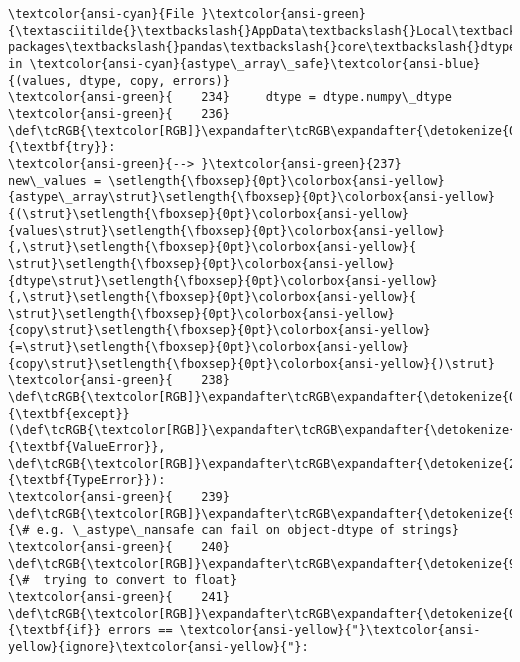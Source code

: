 \documentclass[11pt]{article}
\begin{document}
\begin{Verbatim}[commandchars=\\\{\}, frame=single, framerule=2mm, rulecolor=\color{outerrorbackground}]
\textcolor{ansi-cyan}{File }\textcolor{ansi-green}{\textasciitilde{}\textbackslash{}AppData\textbackslash{}Local\textbackslash{}Programs\textbackslash{}Python\textbackslash{}Python313\textbackslash{}Lib\textbackslash{}site-packages\textbackslash{}pandas\textbackslash{}core\textbackslash{}dtypes\textbackslash{}astype.py:237}, in \textcolor{ansi-cyan}{astype\_array\_safe}\textcolor{ansi-blue}{(values, dtype, copy, errors)}
\textcolor{ansi-green}{    234}     dtype = dtype.numpy\_dtype
\textcolor{ansi-green}{    236} \def\tcRGB{\textcolor[RGB]}\expandafter\tcRGB\expandafter{\detokenize{0,135,0}}{\textbf{try}}:
\textcolor{ansi-green}{--> }\textcolor{ansi-green}{237}     new\_values = \setlength{\fboxsep}{0pt}\colorbox{ansi-yellow}{astype\_array\strut}\setlength{\fboxsep}{0pt}\colorbox{ansi-yellow}{(\strut}\setlength{\fboxsep}{0pt}\colorbox{ansi-yellow}{values\strut}\setlength{\fboxsep}{0pt}\colorbox{ansi-yellow}{,\strut}\setlength{\fboxsep}{0pt}\colorbox{ansi-yellow}{ \strut}\setlength{\fboxsep}{0pt}\colorbox{ansi-yellow}{dtype\strut}\setlength{\fboxsep}{0pt}\colorbox{ansi-yellow}{,\strut}\setlength{\fboxsep}{0pt}\colorbox{ansi-yellow}{ \strut}\setlength{\fboxsep}{0pt}\colorbox{ansi-yellow}{copy\strut}\setlength{\fboxsep}{0pt}\colorbox{ansi-yellow}{=\strut}\setlength{\fboxsep}{0pt}\colorbox{ansi-yellow}{copy\strut}\setlength{\fboxsep}{0pt}\colorbox{ansi-yellow}{)\strut}
\textcolor{ansi-green}{    238} \def\tcRGB{\textcolor[RGB]}\expandafter\tcRGB\expandafter{\detokenize{0,135,0}}{\textbf{except}} (\def\tcRGB{\textcolor[RGB]}\expandafter\tcRGB\expandafter{\detokenize{215,95,95}}{\textbf{ValueError}}, \def\tcRGB{\textcolor[RGB]}\expandafter\tcRGB\expandafter{\detokenize{215,95,95}}{\textbf{TypeError}}):
\textcolor{ansi-green}{    239}     \def\tcRGB{\textcolor[RGB]}\expandafter\tcRGB\expandafter{\detokenize{95,135,135}}{\# e.g. \_astype\_nansafe can fail on object-dtype of strings}
\textcolor{ansi-green}{    240}     \def\tcRGB{\textcolor[RGB]}\expandafter\tcRGB\expandafter{\detokenize{95,135,135}}{\#  trying to convert to float}
\textcolor{ansi-green}{    241}     \def\tcRGB{\textcolor[RGB]}\expandafter\tcRGB\expandafter{\detokenize{0,135,0}}{\textbf{if}} errors == \textcolor{ansi-yellow}{"}\textcolor{ansi-yellow}{ignore}\textcolor{ansi-yellow}{"}:


\end{Verbatim}
\end{document}
